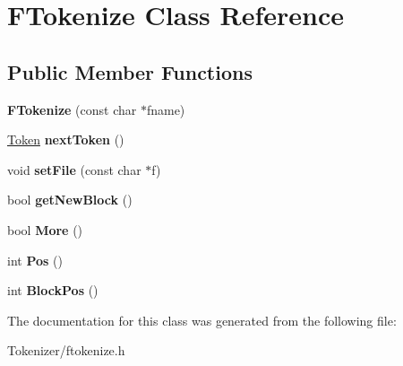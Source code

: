 \hypertarget{classFTokenize}{\section{F\-Tokenize Class Reference}
\label{classFTokenize}
}
\subsection*{Public Member Functions}
\begin{DoxyCompactItemize}
\item 
\hypertarget{classFTokenize_afe8b6b6bf9db47577fa395590cb0715a}{{\bfseries F\-Tokenize} (const char $\ast$fname)}\label{classFTokenize_afe8b6b6bf9db47577fa395590cb0715a}

\item 
\hypertarget{classFTokenize_a84d458f27fcddd5519d6f43ac3bec8ab}{\hyperlink{classToken}{Token} {\bfseries next\-Token} ()}\label{classFTokenize_a84d458f27fcddd5519d6f43ac3bec8ab}

\item 
\hypertarget{classFTokenize_a9ce017e34f2009ca97ffbed62904f4b1}{void {\bfseries set\-File} (const char $\ast$f)}\label{classFTokenize_a9ce017e34f2009ca97ffbed62904f4b1}

\item 
\hypertarget{classFTokenize_af36468609dc665042b5a3bb443a840d9}{bool {\bfseries get\-New\-Block} ()}\label{classFTokenize_af36468609dc665042b5a3bb443a840d9}

\item 
\hypertarget{classFTokenize_ab1318266db89944eb274b8356b4bea64}{bool {\bfseries More} ()}\label{classFTokenize_ab1318266db89944eb274b8356b4bea64}

\item 
\hypertarget{classFTokenize_af2812454ca676e1a07f3a498bab37b72}{int {\bfseries Pos} ()}\label{classFTokenize_af2812454ca676e1a07f3a498bab37b72}

\item 
\hypertarget{classFTokenize_a95a8bf64496978f78aa576a9ab525dfb}{int {\bfseries Block\-Pos} ()}\label{classFTokenize_a95a8bf64496978f78aa576a9ab525dfb}

\end{DoxyCompactItemize}


The documentation for this class was generated from the following file\-:\begin{DoxyCompactItemize}
\item 
Tokenizer/ftokenize.\-h\end{DoxyCompactItemize}

